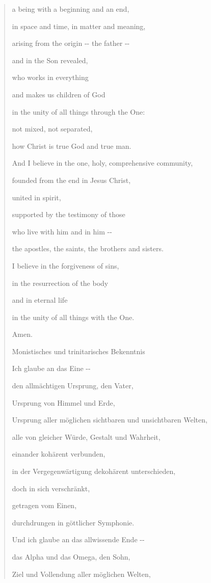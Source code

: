 \documentclass[
  ngerman,
]{article}
\begin{document}
\begin{quote}
a being with a beginning and an end,

in space and time, in matter and meaning,

arising from the origin -\/- the father -\/-

and in the Son revealed,

who works in everything

and makes us children of God

in the unity of all things through the One:

not mixed, not separated,

how Christ is true God and true man.

And I believe in the one, holy, comprehensive community,

founded from the end in Jesus Christ,

united in spirit,

supported by the testimony of those

who live with him and in him -\/-

the apostles, the saints, the brothers and sisters.

I believe in the forgiveness of sins,

in the resurrection of the body

and in eternal life

in the unity of all things with the One.

Amen.

Monistisches und trinitarisches Bekenntnis

Ich glaube an das Eine -\/-

den allmächtigen Ursprung, den Vater,

Ursprung von Himmel und Erde,

Ursprung aller möglichen sichtbaren und unsichtbaren Welten,

alle von gleicher Würde, Gestalt und Wahrheit,

einander kohärent verbunden,

in der Vergegenwärtigung dekohärent unterschieden,

doch in sich verschränkt,

getragen vom Einen,

durchdrungen in göttlicher Symphonie.

Und ich glaube an das allwissende Ende -\/-

das Alpha und das Omega, den Sohn,

Ziel und Vollendung aller möglichen Welten,


\end{quote}
\end{document}
